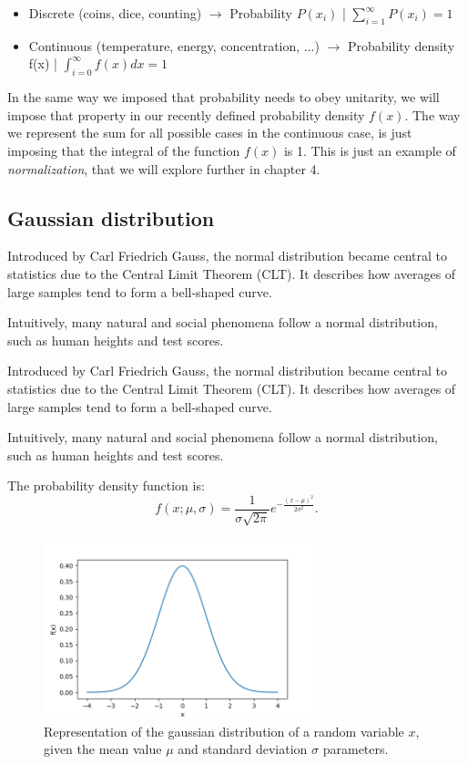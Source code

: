 \documentclass{book}
\begin{document}
\begin{itemize}
\item Discrete (coins, dice, counting) $\longrightarrow$ Probability $P(x_{i})$ | $\sum_{i = 1}^{\infty} P(x_{i}) = 1$
\item Continuous (temperature, energy, concentration, ...) $\longrightarrow$ Probability density f(x) | $\int_{i = 0}^{\infty} f(x) dx = 1$
\end{itemize}

In the same way we imposed that probability needs to obey unitarity, we will impose that property in our recently defined probability density $f(x)$. The way we represent the sum for all possible cases in the continuous case, is just imposing that the integral of the function $f(x)$ is 1. This is just an example of \textit{normalization}, that we will explore further in chapter 4.

\newpage
\subsection{Gaussian distribution}
Introduced by Carl Friedrich Gauss, the normal distribution became central to statistics due to the Central Limit Theorem (CLT). It describes how averages of large samples tend to form a bell-shaped curve.

Intuitively, many natural and social phenomena follow a normal distribution, such as human heights and test scores.

Introduced by Carl Friedrich Gauss, the normal distribution became central to statistics due to the Central Limit Theorem (CLT). It describes how averages of large samples tend to form a bell-shaped curve.

Intuitively, many natural and social phenomena follow a normal distribution, such as human heights and test scores.

The probability density function is:
\begin{equation}
    f(x; \mu, \sigma) = \frac{1}{\sigma \sqrt{2\pi}} e^{-\frac{(x-\mu)^2}{2\sigma^2}}.
\end{equation}

\begin{figure}[ht]
    \centering
    \includegraphics[width=0.7\textwidth]{figures/chapter2/normal.png}
    \caption{Representation of the gaussian distribution of a random variable $x$, given the mean value $\mu$ and standard deviation $\sigma$ parameters.}
    \label{fig:random}
\end{figure}
\end{document}
